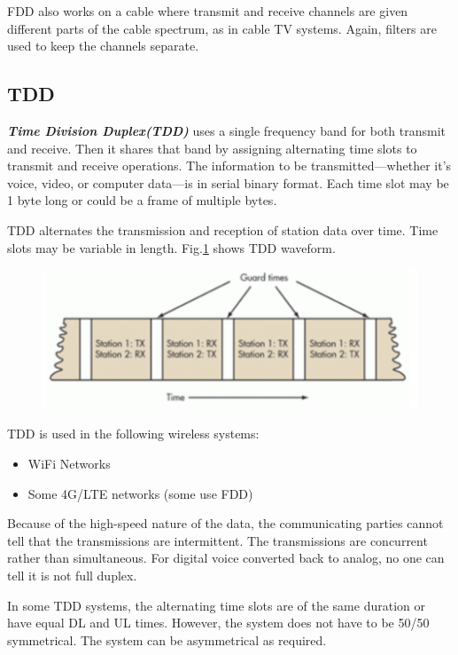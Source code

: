 \documentclass[conference]{IEEEtran}
\begin{document}
FDD also works on a cable where transmit and receive channels are given different parts of the cable spectrum, as in cable TV systems. Again, filters are used to keep the channels separate.

\subsection{TDD}
{\bfseries{\emph{Time Division Duplex(TDD)}}} uses a single frequency band for both transmit and receive. Then it shares that band by assigning alternating time slots to transmit and receive operations. The information to be transmitted—whether it’s voice, video, or computer data—is in serial binary format. Each time slot may be 1 byte long or could be a frame of multiple bytes\cite{6983336}. 

TDD alternates the transmission and reception of station data over time. Time slots may be variable in length. Fig.\ref{fig:TDD} shows TDD waveform.

\begin{figure}[!ht]
	\centering
	\begin{center}
		\includegraphics*[width=0.8\linewidth]{TDD}
		\caption{}
		\label{fig:TDD}
	\end{center}
\end{figure}

TDD is used in the following wireless systems:
\begin{itemize}
	\item WiFi Networks
	\item Some 4G/LTE networks (some use FDD)
\end{itemize}

Because of the high-speed nature of the data, the communicating parties cannot tell that the transmissions are intermittent. The transmissions are concurrent rather than simultaneous. For digital voice converted back to analog, no one can tell it is not full duplex.

In some TDD systems, the alternating time slots are of the same duration or have equal DL and UL times. However, the system does not have to be 50/50 symmetrical. The system can be asymmetrical as required\cite{wireless.org}.
\end{document}

